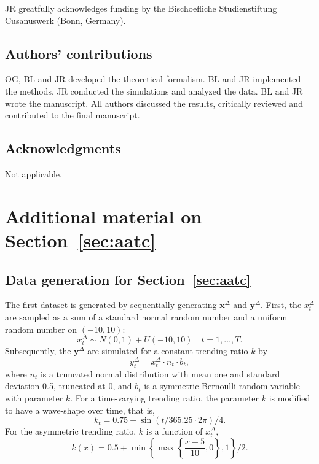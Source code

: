 \documentclass[pdflatex]{sn-jnl}
\theoremstyle{plain}%
\theoremstyle{definition}
\newcommand{\diffx}{\mathbf{x}^{\Delta}}
\newcommand{\diffy}{\mathbf{y}^{\Delta}}
\newcommand{\diffxt}[1][t]{x^{\Delta}_{#1}}
\newcommand{\diffyt}[1][t]{y^{\Delta}_{#1}}
\begin{document}
JR greatfully acknowledges funding by the Bischoefliche Studienstiftung Cusanuswerk (Bonn, Germany).

\subsection*{Authors' contributions}

OG, BL and JR developed the theoretical formalism.
BL and JR implemented the methods.
JR conducted the simulations and analyzed the data.
BL and JR wrote the manuscript.
All authors discussed the results, critically reviewed and contributed to the final manuscript.

\subsection*{Acknowledgments}

Not applicable.

\printbibliography
%

\appendix

\section{Additional material on Section~\ref{sec:aatc}}\label{sec:appendix-trending}

\subsection{Data generation for Section~\ref{sec:aatc}}\label{subsec:app-trending-data-generation}

The first dataset is generated by sequentially generating $\diffx$ and $\diffy$.
First, the $\diffxt$ are sampled as a sum of a standard normal random number and a uniform random number on $(-10, 10)$:
\begin{equation*}
    \diffxt \sim N(0, 1) + U(-10, 10) \quad t = 1, \dots, T.
\end{equation*}
Subsequently, the $\diffy$ are simulated for a constant trending ratio $k$ by
\begin{equation*}
    \diffyt = \diffxt \cdot n_t \cdot b_t,
\end{equation*}
where $n_t$ is a truncated normal distribution with mean one and standard deviation 0.5, truncated at 0, and $b_t$ is a symmetric Bernoulli random variable with parameter $k$.
For a time-varying trending ratio, the parameter $k$ is modified to have a wave-shape over time, that is,
\begin{equation*}
    k_t = 0.75 + \sin(t / 365.25 \cdot 2 \pi) / 4.
\end{equation*}
For the asymmetric trending ratio, $k$ is a function of $\diffxt$,
\begin{equation*}
    k(x) = 0.5 + \min \left\{ \max \left\{ \frac{x + 5}{10}, 0  \right\} , 1 \right\} / 2.
\end{equation*}
\end{document}
